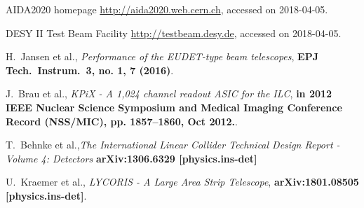 \documentclass[conference]{IEEEtran}
\begin{document}
%
%
%
\begin{thebibliography}{1}


AIDA2020 homepage \url{http://aida2020.web.cern.ch}, accessed on 2018-04-05.

DESY II Test Beam Facility \url{http://testbeam.desy.de}, accessed on 2018-04-05.

H.~Jansen et al., {\em Performance of the EUDET-type beam telescopes}, \textbf{EPJ Tech.\ Instrum.\  {\bf 3}, no. 1, 7 (2016)}.

J.~Brau et al., {\em KPiX - A 1,024 channel readout ASIC for the ILC}, \textbf{in 2012 IEEE Nuclear Science Symposium and Medical Imaging Conference Record (NSS/MIC), pp. 1857–1860, Oct 2012.}.

T.~Behnke et al.,{\em The International Linear Collider Technical Design Report - Volume 4: Detectors}  \textbf{arXiv:1306.6329 [physics.ins-det]}


U.~Kraemer et al., {\em LYCORIS - A Large Area Strip Telescope}, \textbf{arXiv:1801.08505 [physics.ins-det]}.

\end{thebibliography}




\end{document}
